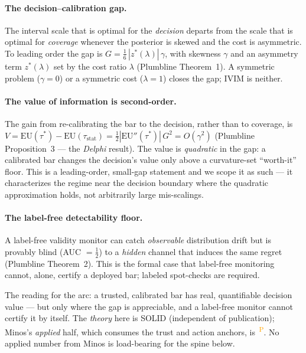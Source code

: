 \documentclass[11pt]{article}
\newcommand{\PROV}{\textsuperscript{\textcolor{orange}{\,P}}}
\begin{document}
\paragraph{The decision--calibration gap.} The interval scale that is optimal for the
\emph{decision} departs from the scale that is optimal for \emph{coverage} whenever the posterior
is skewed and the cost is asymmetric. To leading order the gap is
$G = \tfrac{1}{6}\,|z^{*}(\lambda)|\,\gamma$, with skewness $\gamma$ and an asymmetry term
$z^{*}(\lambda)$ set by the cost ratio $\lambda$ (Plumbline Theorem~1). A symmetric problem
($\gamma=0$) or a symmetric cost ($\lambda=1$) closes the gap; IVIM is neither.

\paragraph{The value of information is second-order.} The gain from re-calibrating the bar to the
decision, rather than to coverage, is
$V = \mathrm{EU}(\tau^{*}) - \mathrm{EU}(\tau_{\mathrm{stat}}) = \tfrac12|\mathrm{EU}''(\tau^{*})|\,G^{2} = O(\gamma^{2})$
(Plumbline Proposition~3 --- the \emph{Delphi} result). The value is \emph{quadratic} in the
gap: a calibrated bar changes the decision's value only above a curvature-set ``worth-it''
floor. This is a leading-order, small-gap statement and we scope it as such --- it characterizes
the regime near the decision boundary where the quadratic approximation holds, not arbitrarily
large mis-scalings.

\paragraph{The label-free detectability floor.} A label-free validity monitor can catch
\emph{observable} distribution drift but is provably blind (AUC $=\tfrac12$) to a \emph{hidden}
channel that induces the same regret (Plumbline Theorem~2). This is the formal case that
label-free monitoring cannot, alone, certify a deployed bar; labeled spot-checks are required.

The reading for the arc: a trusted, calibrated bar has real, quantifiable decision value --- but
only where the gap is appreciable, and a label-free monitor cannot certify it by itself. The
\emph{theory} here is SOLID (independent of publication); Minos's \emph{applied} half, which
consumes the trust and action anchors, is \PROV{}. No applied number from Minos is load-bearing
for the spine below.

\end{document}
